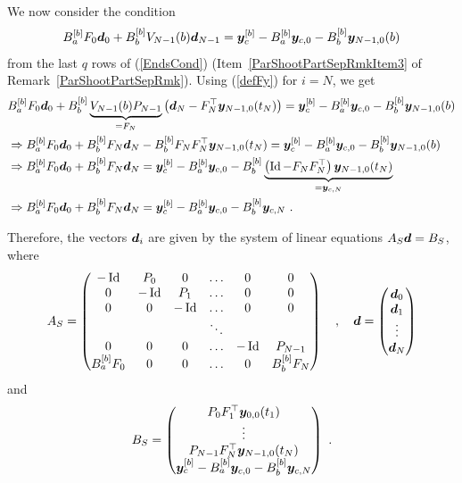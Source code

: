 We now consider the condition
\[
B_a^{[b]} F_0 \bm{d}_0 +B_b^{[b]} V_{N-1}(b) \bm{d}_{N-1}
= \bm{y}_c^{[b]} - B_a^{[b]} \bm{y}_{c,0} - B_b^{[b]} \bm{y}_{N-1,0}(b) 
\]
from the last $q$ rows of (\ref{EndsCond})
(Item~\ref{ParShootPartSepRmkItem3} of
Remark~\ref{ParShootPartSepRmk}).  Using (\ref{defFy}) for $i=N$, we
get
\begin{align*}
&B_a^{[b]} F_0 \bm{d}_0 +B_b^{[b]} \underbrace{V_{N-1}(b) P_{N-1}}_{=F_N} \left(
\bm{d}_N - F_N^\top\bm{y}_{N-1,0}(t_N)\right)
= \bm{y}_c^{[b]} - B_a^{[b]} \bm{y}_{c,0} - B_b^{[b]} \bm{y}_{N-1,0}(b) \\
&\Rightarrow
B_a^{[b]} F_0 \bm{d}_0 +B_b^{[b]} F_N \bm{d}_N
- B_b^{[b]} F_NF_N^\top \bm{y}_{N-1,0}(t_N)
= \bm{y}_c^{[b]} - B_a^{[b]} \bm{y}_{c,0} - B_b^{[b]} \bm{y}_{N-1,0}(b) \\
&\Rightarrow
B_a^{[b]} F_0 \bm{d}_0 +B_b^{[b]} F_N \bm{d}_N
= \bm{y}_c^{[b]} - B_a^{[b]} \bm{y}_{c,0} - B_b^{[b]}
\underbrace{\left( \operatorname{Id} - F_NF_N^\top \right)
\bm{y}_{N-1,0}(t_N)}_{= \bm{y}_{c,N}}  \\
&\Rightarrow
B_a^{[b]} F_0\bm{d}_0 + B_b^{[b]} F_N \bm{d}_N = \bm{y}_c^{[b]} -
B_a^{[b]} \bm{y}_{c,0} - B_b^{[b]} \bm{y}_{c,N}  \ .
\end{align*}

Therefore, the vectors $\bm{d}_i$ are given by the system of linear
equations $A_S \bm{d} = B_S$, where
\[
A_S = \begin{pmatrix}
-\operatorname{Id} & P_0 & 0 & \ldots & 0 & 0 \\
0 & -\operatorname{Id} & P_1 & \ldots & 0 & 0 \\
0 & 0 & -\operatorname{Id} & \ldots & 0 & 0 \\
 & & & \ddots & & \\
0 & 0 & 0 & \ldots & -\operatorname{Id} & P_{N-1} \\
B_a^{[b]} F_0 & 0 & 0 & \ldots & 0 & B_b^{[b]} F_N
\end{pmatrix}
\quad , \quad
\bm{d} = \begin{pmatrix} \bm{d}_0 \\ \bm{d}_1 \\ \vdots \\
\bm{d}_N \end{pmatrix}
\]
and
\[
B_S = \begin{pmatrix}
P_0 F_1^\top \bm{y}_{0,0}(t_1) \\
\vdots \\
P_{N-1} F_N^\top \bm{y}_{N-1,0}(t_N) \\
\bm{y}_{c}^{[b]} - B_a^{[b]} \bm{y}_{c,0} - B_b^{[b]} \bm{y}_{c,N}
\end{pmatrix} \ .
\]

